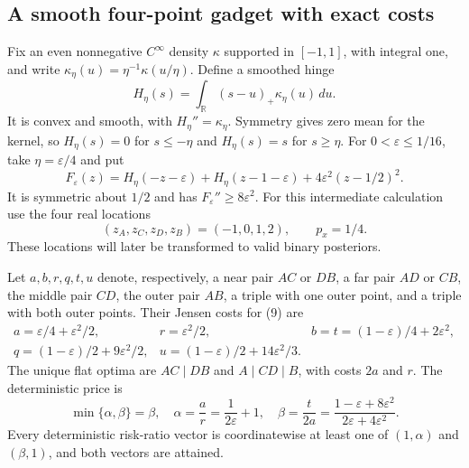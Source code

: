 \subsection{A smooth four-point gadget with exact costs}

Fix an even nonnegative $C^\infty$ density $\kappa$ supported in
$[-1,1]$, with integral one, and write
$\kappa_\eta(u)=\eta^{-1}\kappa(u/\eta)$.  Define a smoothed hinge
\[
 H_\eta(s)=\int_{\mathbb R}(s-u)_+\kappa_\eta(u)\,du.
\]
It is convex and smooth, with $H_\eta''=\kappa_\eta$.
Symmetry gives zero mean for the kernel, so
$H_\eta(s)=0$ for $s\leq-\eta$ and $H_\eta(s)=s$ for $s\geq\eta$.
For $0<\varepsilon\leq1/16$, take $\eta=\varepsilon/4$ and put
\[
 F_\varepsilon(z)
 =H_\eta(-z-\varepsilon)
  +H_\eta(z-1-\varepsilon)
  +4\varepsilon^2(z-1/2)^2.
 \tag{9}\label{eq:hinge-gadget}
\]
It is symmetric about $1/2$ and has $F_\varepsilon''\geq8\varepsilon^2$.
For this intermediate calculation use the four real locations
\[
 (z_A,z_C,z_D,z_B)=(-1,0,1,2),\qquad p_x=1/4.
\]
These locations will later be transformed to valid binary posteriors.

\begin{lemma}
\label{lem:equal-mass-costs}
Let $a,b,r,q,t,u$ denote, respectively, a near pair $AC$ or $DB$, a
far pair $AD$ or $CB$, the middle pair $CD$, the outer pair $AB$, a
triple with one outer point, and a triple with both outer points.
Their Jensen costs for (9) are
\[
\begin{array}{lll}
 a=\varepsilon/4+\varepsilon^2/2,&
 r=\varepsilon^2/2,&
 b=t=(1-\varepsilon)/4+2\varepsilon^2,\\[2pt]
 q=(1-\varepsilon)/2+9\varepsilon^2/2,&
 u=(1-\varepsilon)/2+14\varepsilon^2/3.&
\end{array}
\tag{10}\label{eq:gadget-six-costs}
\]
The unique flat optima are $AC\mid DB$ and $A\mid CD\mid B$, with
costs $2a$ and $r$.  The deterministic price is
\[
 \min\{\alpha,\beta\}=\beta,
 \quad \alpha=\frac ar=\frac1{2\varepsilon}+1,\quad
 \beta=\frac t{2a}
       =\frac{1-\varepsilon+8\varepsilon^2}
              {2\varepsilon+4\varepsilon^2}.
 \tag{11}\label{eq:gadget-price}
\]
Every deterministic risk-ratio vector is coordinatewise at least one
of $(1,\alpha)$ and $(\beta,1)$, and both vectors are attained.
\end{lemma}

